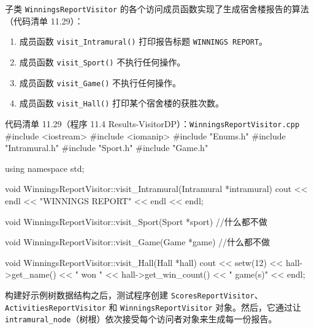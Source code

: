 子类 \texttt{Winnings\allowbreak{}Report\allowbreak{}Visitor} 的各个访问成员函数实现了生成宿舍楼报告的算法（代码清单 11.29）：

\begin{enumerate}
\item 成员函数 \texttt{visit\_\allowbreak{}Intramural(\allowbreak{})\allowbreak{}} 打印报告标题 \texttt{WINNINGS REPORT}。
\item 成员函数 \texttt{visit\_\allowbreak{}Sport(\allowbreak{})\allowbreak{}} 不执行任何操作。
\item 成员函数 \texttt{visit\_\allowbreak{}Game(\allowbreak{})\allowbreak{}} 不执行任何操作。
\item 成员函数 \texttt{visit\_\allowbreak{}Hall(\allowbreak{})\allowbreak{}} 打印某个宿舍楼的获胜次数。
\end{enumerate}

\begin{codeboxt}{代码清单 11.29（程序 11.4 Results-VisitorDP）：\texttt{Winnings\allowbreak{}Report\allowbreak{}Visitor.\allowbreak{}cpp}}
#include <iostream>
#include <iomanip>
#include "Enums.h"
#include "Intramural.h"
#include "Sport.h"
#include "Game.h"

using namespace std;

void WinningsReportVisitor::visit_Intramural(Intramural *intramural)
{
    cout << endl << "WINNINGS REPORT" << endl << endl;
}

void WinningsReportVisitor::visit_Sport(Sport *sport)
{
    //什么都不做
}

void WinningsReportVisitor::visit_Game(Game *game)
{
    //什么都不做
}

void WinningsReportVisitor::visit_Hall(Hall *hall)
{
    cout << setw(12) << hall->get_name() << " won "
         << hall->get_win_count() << " game(s)" << endl;
}
\end{codeboxt}


构建好示例树数据结构之后，测试程序创建 \texttt{Scores\allowbreak{}Report\allowbreak{}Visitor}、\texttt{Activities\allowbreak{}Report\allowbreak{}Visitor} 和 \texttt{Winnings\allowbreak{}Report\allowbreak{}Visitor} 对象。然后，它通过让 \texttt{intramural\_\allowbreak{}node}（树根）依次接受每个访问者对象来生成每一份报告。

